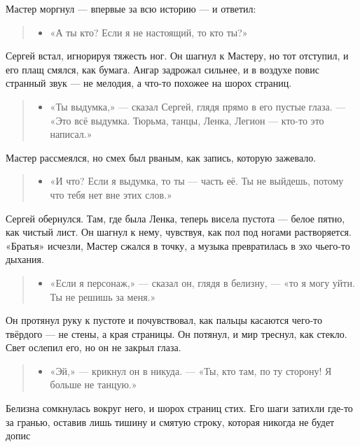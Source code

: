 \documentclass[12pt,a4paper]{book}
\newenvironment{dialogue}{\begin{quote}\itshape\begin{itemize}\item[]}{\end{itemize}\end{quote}}
\begin{document}
Мастер моргнул --- впервые за всю историю --- и ответил:

\begin{dialogue}
«А ты кто? Если я не настоящий, то кто ты?»
\end{dialogue}

Сергей встал, игнорируя тяжесть ног. Он шагнул к Мастеру, но тот отступил, и его плащ смялся, как бумага. Ангар задрожал сильнее, и в воздухе повис странный звук --- не мелодия, а что-то похожее на шорох страниц.

\begin{dialogue}
«Ты выдумка,» --- сказал Сергей, глядя прямо в его пустые глаза. --- «Это всё выдумка. Тюрьма, танцы, Ленка, Легион — кто-то это написал.»
\end{dialogue}

Мастер рассмеялся, но смех был рваным, как запись, которую зажевало.

\begin{dialogue}
«И что? Если я выдумка, то ты — часть её. Ты не выйдешь, потому что тебя нет вне этих слов.»
\end{dialogue}

Сергей обернулся. Там, где была Ленка, теперь висела пустота --- белое пятно, как чистый лист. Он шагнул к нему, чувствуя, как пол под ногами растворяется. «Братья» исчезли, Мастер сжался в точку, а музыка превратилась в эхо чьего-то дыхания.

\begin{dialogue}
«Если я персонаж,» --- сказал он, глядя в белизну, --- «то я могу уйти. Ты не решишь за меня.»
\end{dialogue}

Он протянул руку к пустоте и почувствовал, как пальцы касаются чего-то твёрдого --- не стены, а края страницы. Он потянул, и мир треснул, как стекло. Свет ослепил его, но он не закрыл глаза.

\begin{dialogue}
«Эй,» --- крикнул он в никуда. --- «Ты, кто там, по ту сторону! Я больше не танцую.»
\end{dialogue}

Белизна сомкнулась вокруг него, и шорох страниц стих. Его шаги затихли где-то за гранью, оставив лишь тишину и смятую строку, которая никогда не будет допис
\end{document}
